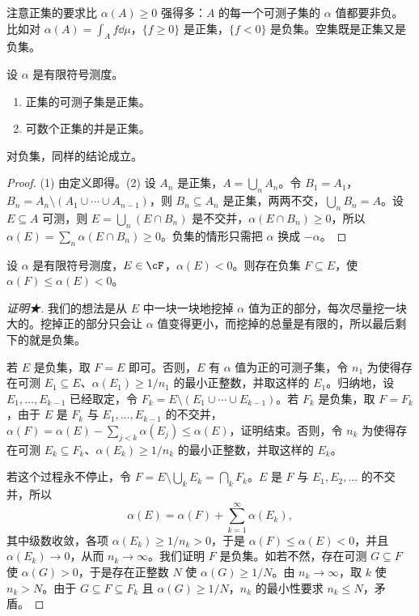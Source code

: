 注意正集的要求比 $\alpha(A)\geqslant0$ 强得多：$A$ 的每一个可测子集的 $\alpha$ 值都要非负。比如对 $\alpha(A)=\int_Af\dd\mu$，$\{f\geqslant0\}$ 是正集，$\{f<0\}$ 是负集。空集既是正集又是负集。

\begin{lemma}\label{lem:ac:positive-sets}
设 $\alpha$ 是有限符号测度。
\begin{enumerate}
\item 正集的可测子集是正集。
\item 可数个正集的并是正集。
\end{enumerate}
对负集，同样的结论成立。
\end{lemma}
\begin{proof}
(1) 由定义即得。(2) 设 $A_n$ 是正集，$A=\bigcup_nA_n$。令 $B_1=A_1$，$B_n=A_n\setminus(A_1\cup\cdots\cup A_{n-1})$，则 $B_n\subseteq A_n$ 是正集，两两不交，$\bigcup_nB_n=A$。设 $E\subseteq A$ 可测，则 $E=\bigcup_n(E\cap B_n)$ 是不交并，$\alpha(E\cap B_n)\geqslant0$，所以 $\alpha(E)=\sum_n\alpha(E\cap B_n)\geqslant0$。负集的情形只需把 $\alpha$ 换成 $-\alpha$。
\end{proof}

\begin{lemma}\label{lem:ac:negative-subset}
设 $\alpha$ 是有限符号测度，$E\in\cF$，$\alpha(E)<0$。则存在负集 $F\subseteq E$，使 $\alpha(F)\leqslant\alpha(E)<0$。
\end{lemma}
\begin{proof}[证明★]
我们的想法是从 $E$ 中一块一块地挖掉 $\alpha$ 值为正的部分，每次尽量挖一块大的。挖掉正的部分只会让 $\alpha$ 值变得更小，而挖掉的总量是有限的，所以最后剩下的就是负集。

若 $E$ 是负集，取 $F=E$ 即可。否则，$E$ 有 $\alpha$ 值为正的可测子集，令 $n_1$ 为使得存在可测 $E_1\subseteq E$、$\alpha(E_1)\geqslant1/n_1$ 的最小正整数，并取这样的 $E_1$。归纳地，设 $E_1,\dots,E_{k-1}$ 已经取定，令 $F_k=E\setminus(E_1\cup\cdots\cup E_{k-1})$。若 $F_k$ 是负集，取 $F=F_k$，由于 $E$ 是 $F_k$ 与 $E_1,\dots,E_{k-1}$ 的不交并，$\alpha(F)=\alpha(E)-\sum_{j<k}\alpha(E_j)\leqslant\alpha(E)$，证明结束。否则，令 $n_k$ 为使得存在可测 $E_k\subseteq F_k$、$\alpha(E_k)\geqslant1/n_k$ 的最小正整数，并取这样的 $E_k$。

若这个过程永不停止，令 $F=E\setminus\bigcup_kE_k=\bigcap_kF_k$。$E$ 是 $F$ 与 $E_1,E_2,\dots$ 的不交并，所以
\[
\alpha(E)=\alpha(F)+\sum_{k=1}^\infty\alpha(E_k),
\]
其中级数收敛，各项 $\alpha(E_k)\geqslant1/n_k>0$，于是 $\alpha(F)\leqslant\alpha(E)<0$，并且 $\alpha(E_k)\to0$，从而 $n_k\to\infty$。我们证明 $F$ 是负集。如若不然，存在可测 $G\subseteq F$ 使 $\alpha(G)>0$，于是存在正整数 $N$ 使 $\alpha(G)\geqslant1/N$。由 $n_k\to\infty$，取 $k$ 使 $n_k>N$。由于 $G\subseteq F\subseteq F_k$ 且 $\alpha(G)\geqslant1/N$，$n_k$ 的最小性要求 $n_k\leqslant N$，矛盾。
\end{proof}

